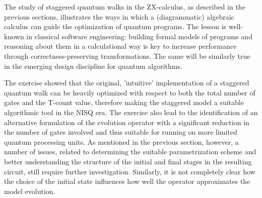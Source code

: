 The study of staggered quantum walks in the ZX-calculus, as described in the previous sections, illustrates the ways in which a (diagrammatic) algebraic calculus can guide the optimization of quantum programs. The lesson is well-known in classical software engineering: building formal models of programs and reasoning about them in a calculational way is key to increase performance through correctness-preserving transformations. The same will be similarly true in the emerging design discipline for quantum algorithms.

The exercise showed that the original, 'intuitive' implementation of a staggered quantum walk can be heavily optimized with respect to both the total number of gates and the T-count value, therefore making the staggered model a suitable algorithmic tool in the NISQ era\cite{Preskill2018}. The exercise also lead to the identification of an alternative formulation of the evolution operator with a significant reduction in the number of gates involved and thus suitable for running on more limited quantum processing units. As mentioned in the previous section, however, a number of issues, related to determining the  suitable parametrization scheme and better understanding the structure of the initial and final stages in the resulting circuit,  still require further investigation. Similarly, it is not completely  clear how the choice of the initial state 
influences how well the operator approximates the model evolution.

%
%
%





